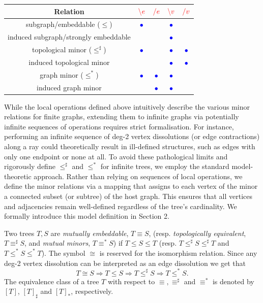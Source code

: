 \documentclass[12pt]{amsart}
\numberwithin{mytheorem}{section} %
\numberwithin{mylemma}{section} %
\numberwithin{mycorollary}{section} %
\begin{document}
\bigskip

\begin{center}
\begin{tabular}{ | c || c | c | c | c | }
\hline
Relation & $ \textcolor{red}{\backslash e}$ &  $\textcolor{red}{\slash e}$ & $ \textcolor{red}{\backslash v}$ &  $\textcolor{red}{\slash v}$\\
\hline
\hline
 subgraph/embeddable ($\leq$) &\textcolor{blue}{ $\bullet$} & &\textcolor{blue}{ $\bullet$} & \\ 
 \hline
  induced subgraph/strongly embeddable & & &\textcolor{blue}{ $\bullet$} & \\ 
\hline
  \hline
 topological minor ($\leq^\sharp$) & \textcolor{blue}{ $\bullet$}& & \textcolor{blue}{ $\bullet$}&\textcolor{blue}{ $\bullet$} \\ 
 \hline
 induced topological minor & & &\textcolor{blue}{ $\bullet$} &\textcolor{blue}{ $\bullet$} \\ 
\hline
 \hline
 graph minor ($\leq^*$) & \textcolor{blue}{ $\bullet$}&\textcolor{blue}{ $\bullet$} &\textcolor{blue}{ $\bullet$} & \\ 
 \hline
   induced graph minor && \textcolor{blue}{ $\bullet$}& \textcolor{blue}{ $\bullet$} & \\ 
   \hline
  

\end{tabular}
\end{center}

\bigskip

While the local operations defined above intuitively describe the various minor relations for finite graphs, extending them to infinite graphs via potentially infinite sequences of operations requires strict formalisation. For instance, performing an infinite sequence of deg-2 vertex dissolutions (or edge contractions) along a ray could theoretically result in ill-defined structures, such as edges with only one endpoint or none at all. To avoid these pathological limits and rigorously define $\leq^\sharp$ and $\leq^*$ for infinite trees, we employ the standard model-theoretic approach. Rather than relying on sequences of local operations, we define the minor relations via a mapping that assigns to each vertex of the minor a connected subset (or subtree) of the host graph. This ensures that all vertices and adjacencies remain well-defined regardless of the tree's cardinality. We formally introduce this model definition in Section 2.

\bigskip

\noindent
Two trees $T,S$ are {\it mutually embeddable}, $T\equiv S$, (resp. {\it topologically equivalent}, $T\equiv^\sharp S$, and {\it mutual minors}, $T\equiv^* S$) if $T \leq S \leq T$ (resp. $T \leq^\sharp S \leq^\sharp T$ and $T \leq^* S \leq^* T$). The symbol $\cong$ is reserved for the isomorphism relation. Since any deg-2 vertex dissolution can be interpreted as an edge dissolution we get that 
\[
T\cong S \Rightarrow T \leq S \Rightarrow T \leq^\sharp S \Rightarrow T \leq^* S.
\]
 The equivalence class of a tree $T$ with respect to $\equiv, \equiv^\sharp$ and $\equiv^*$ is denoted by $[T]$, $[T]_\sharp$ and $[T]_*$, respectively. 
\end{document}
